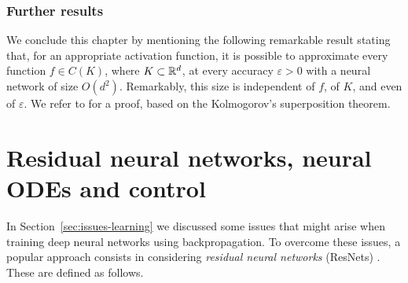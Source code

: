 \subsection{Further results}

We conclude this chapter by mentioning the following remarkable result stating that, for an appropriate activation function, it is possible to approximate every function $f\in C(K)$, where $K\subset \mathbb{R}^d$, at every accuracy $\varepsilon>0$ with a neural network of size $O(d^2)$. Remarkably, this size is independent of $f$, of $K$, and even of $\varepsilon$.
We refer to \cite[Section~3.2]{petersenMathematical2025} for a proof, based on the Kolmogorov's superposition theorem.


\chapter{Residual neural networks, neural ODEs and control}
\label{chp:resnets}

In Section~\ref{sec:issues-learning} we discussed some issues that might arise when training deep neural networks using backpropagation.
To overcome these issues, a popular approach consists in considering \emph{residual neural networks} (ResNets) \cite{heDeep2016}.
These are defined as follows. 

